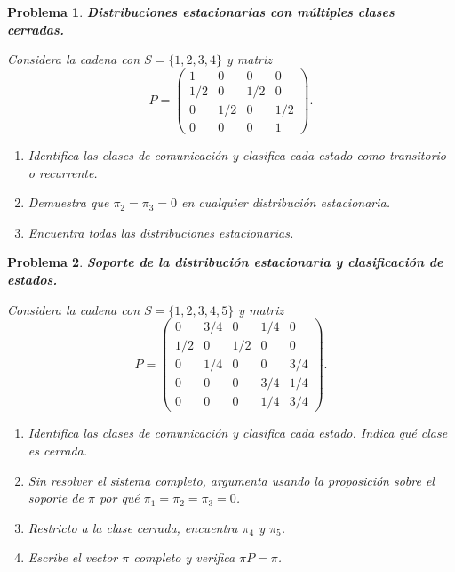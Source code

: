 \documentclass[12pt]{article}
\newtheorem{problem}{Problema}
\begin{document}
\begin{problem}
\textbf{Distribuciones estacionarias con múltiples clases cerradas.}

Considera la cadena con $S = \{1, 2, 3, 4\}$ y matriz
\[
    P = \begin{pmatrix}
        1   & 0   & 0   & 0   \\
        1/2 & 0   & 1/2 & 0   \\
        0   & 1/2 & 0   & 1/2 \\
        0   & 0   & 0   & 1
    \end{pmatrix}.
\]
\begin{enumerate}
    \item[(a)] Identifica las clases de comunicación y clasifica cada estado como transitorio o recurrente.
    \item[(b)] Demuestra que $\pi_2 = \pi_3 = 0$ en cualquier distribución estacionaria.
    \item[(c)] Encuentra \emph{todas} las distribuciones estacionarias.
\end{enumerate}
\end{problem}

\begin{problem}
\textbf{Soporte de la distribución estacionaria y clasificación de estados.}

Considera la cadena con $S = \{1, 2, 3, 4, 5\}$ y matriz
\[
    P = \begin{pmatrix}
        0   & 3/4 & 0   & 1/4 & 0   \\
        1/2 & 0   & 1/2 & 0   & 0   \\
        0   & 1/4 & 0   & 0   & 3/4 \\
        0   & 0   & 0   & 3/4 & 1/4 \\
        0   & 0   & 0   & 1/4 & 3/4
    \end{pmatrix}.
\]
\begin{enumerate}
    \item[(a)] Identifica las clases de comunicación y clasifica cada estado. Indica qué clase es cerrada.
    \item[(b)] Sin resolver el sistema completo, argumenta usando la proposición sobre el soporte de $\pi$ por qué $\pi_1 = \pi_2 = \pi_3 = 0$.
    \item[(c)] Restricto a la clase cerrada, encuentra $\pi_4$ y $\pi_5$.
    \item[(d)] Escribe el vector $\pi$ completo y verifica $\pi P = \pi$.
\end{enumerate}
\end{problem}
\end{document}
